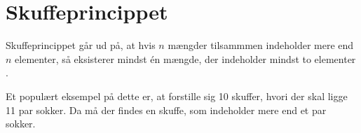 \chapter{Skuffeprincippet}
Skuffeprincippet går ud på, at hvis $n$ mængder tilsammmen indeholder mere end $n$ elementer, så eksisterer mindst én mængde, der indeholder mindst to elementer \citep{skuffep}.
 
Et populært eksempel på dette er, at forstille sig 10 skuffer, hvori der skal ligge 11 par sokker. Da må der findes en skuffe, som indeholder mere end et par sokker.  



